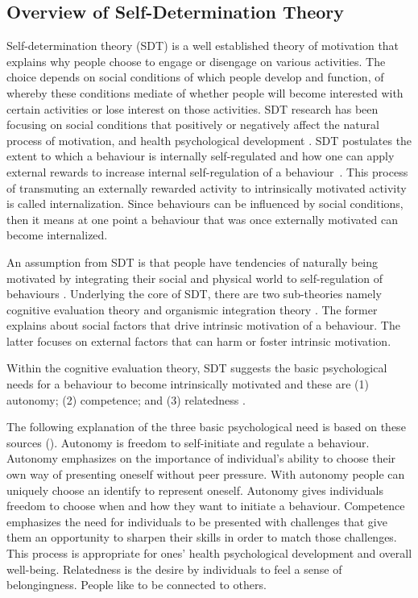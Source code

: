 \documentclass{sig-alternate}
\begin{document}
\subsection{Overview of Self-Determination Theory}
Self-determination theory (SDT) is a well established theory of motivation that explains why people choose to engage or disengage on various activities. The choice depends on social conditions of which people develop and function, of whereby these conditions mediate of whether people will become interested with certain activities or lose interest on those activities. SDT research has been focusing on social conditions that positively or negatively affect the natural process of motivation, and health psychological development \cite{ryan2000:self}. SDT postulates the extent to which a behaviour is internally self-regulated and how one can apply external rewards to increase internal self-regulation of a behaviour~\cite{ryan2000:self}. This process of transmuting an externally rewarded activity to intrinsically motivated activity is called internalization. Since behaviours can be influenced by social conditions, then it means at one point a behaviour that was once externally motivated can become internalized.

An assumption from SDT is that people have tendencies of naturally being motivated by integrating their social and physical world to self-regulation of behaviours \cite{lee2015:relating}. Underlying the core of SDT, there are two sub-theories namely cognitive evaluation theory and organismic integration theory \cite{ryan2000:self}. The former explains about social factors that drive intrinsic motivation of a behaviour. The latter focuses on external factors that can harm or foster intrinsic motivation.

Within the cognitive evaluation theory, SDT suggests the basic psychological needs for a behaviour to become intrinsically motivated and these are (1) autonomy; (2) competence; and (3) relatedness \cite{deci1985:intrinsic}.

The following explanation of the three basic psychological need is based on these sources (\cite{deci1985:intrinsic,ryan2000:self,lee2015:relating}). Autonomy is freedom to self-initiate and regulate a behaviour. Autonomy emphasizes on the importance of individual's ability to choose their own way of presenting oneself without peer pressure. With autonomy people can uniquely choose an identify to represent oneself. Autonomy gives individuals freedom to choose when and how they want to initiate a behaviour. Competence emphasizes the need for individuals to be presented with challenges that give them an opportunity to sharpen their skills in order to match those challenges. This process is appropriate for ones' health psychological development and  overall well-being\cite{zhang2008:motivational}. Relatedness is the desire by individuals to feel a sense of belongingness. People like to be connected to others.
\end{document}
